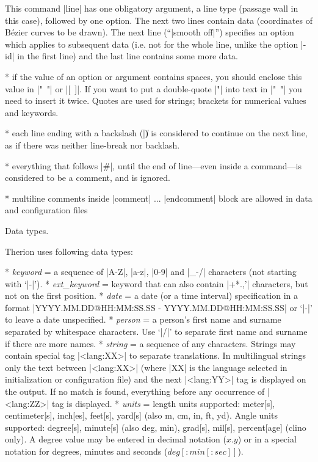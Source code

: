 This command |line| has one obligatory argument, a line type (passage wall in
this case), followed by one option. The next two lines contain data (coordinates of
B\'ezier curves to be drawn). The next line (``|smooth off|'') specifies an option which
applies to subsequent data (i.e. not for the whole line, unlike the option |-id|
in the first line) and the last line contains some more data.

* if the value of an option or argument contains spaces, you should enclose this
  value in \hbox{|" "|} or \hbox{|[ ]|}. If you want to put a double-quote |"| into
  text in \hbox{|" "|} you need to insert it twice. Quotes are used for strings;
  brackets for numerical values and keywords.

* each line ending with a backslash (|\|) is considered to continue on
  the next line, as if there was neither line-break nor backlash.

* everything that follows |#|, until the end of line---even inside a command---is
  considered to be a comment, and is ignored.

* multiline comments inside |comment| ... |endcomment| block are allowed in
  data and configuration files

\endlist


\subchapter Data types.

Therion uses following data types:

\list
* {\it keyword} = a sequence of |A-Z|, |a-z|, |0-9| and |_-/| characters
             (not starting with `|-|').
* {\it ext\_keyword} = keyword that can also contain |+*.,'| characters,
            but not on the first position.
* {\it date} = a date (or a time interval) specification in a format\hfil\break
          |YYYY.MM.DD@HH:MM:SS.SS - YYYY.MM.DD@HH:MM:SS.SS| or `|-|'
          to leave a date unspecified.
* {\it person} = a person's first name and surname separated by whitespace characters.
            Use `|/|' to separate first name and surname if there are
            more names.
* {\it string} = a sequence of any characters.
    Strings may contain special tag |<lang:XX>| to separate
    translations.
    In multilingual strings only the text between |<lang:XX>|
    (where |XX| is the language selected in initialization
    or configuration file) and the next |<lang:YY>|
    tag is displayed on the output.
    If no match is found, everything before any occurrence of
    |<lang:ZZ>| tag is displayed.
* {\it units} = length units supported:
           meter[s], centimeter[s], inch[es], feet[s], yard[s]
           (also m, cm, in, ft, yd).
           Angle units supported: degree[s], minute[s] (also deg, min),
	   grad[s], mil[s], percent[age] (clino only).
           A degree value may be entered in decimal notation
	   ($x.y$) or in a special notation for degrees, minutes and seconds
	   ($deg[{:}min[{:}sec]]$).
\endlist



